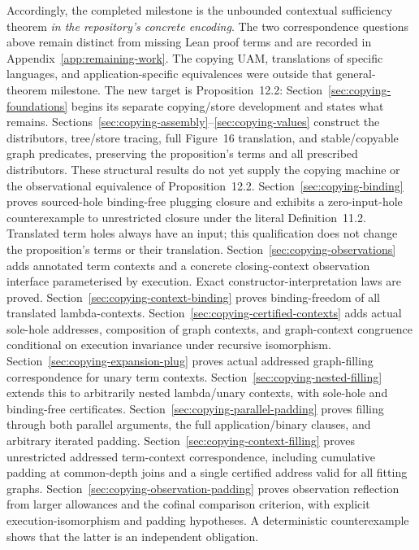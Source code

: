 Accordingly, the completed milestone is the unbounded contextual sufficiency
theorem \emph{in the repository's concrete encoding}. The two correspondence
questions above remain distinct from missing Lean proof terms and are recorded
in Appendix~\ref{app:remaining-work}. The copying UAM, translations of specific
languages, and application-specific equivalences were outside that general-theorem
milestone. The new target is Proposition~12.2: Section~\ref{sec:copying-foundations}
begins its separate copying/store development and states what remains.
Sections~\ref{sec:copying-assembly}--\ref{sec:copying-values} construct the
distributors, tree/store tracing, full Figure~16 translation, and stable/copyable
graph predicates, preserving the proposition's terms and all prescribed
distributors. These structural results do not yet supply the copying machine
or the observational equivalence of Proposition~12.2.
Section~\ref{sec:copying-binding} proves sourced-hole binding-free plugging
closure and exhibits a zero-input-hole counterexample to unrestricted closure
under the literal Definition~11.2. Translated term holes always have an input;
this qualification does not change the proposition's terms or their translation.
Section~\ref{sec:copying-observations} adds annotated term contexts and a
concrete closing-context observation interface parameterised by execution.
Exact constructor-interpretation laws are proved.
Section~\ref{sec:copying-context-binding} proves binding-freedom of all
translated lambda-contexts. Section~\ref{sec:copying-certified-contexts}
adds actual sole-hole addresses, composition of graph contexts, and
graph-context congruence conditional on execution invariance under recursive
isomorphism. Section~\ref{sec:copying-expansion-plug} proves actual
addressed graph-filling correspondence for unary term contexts.
Section~\ref{sec:copying-nested-filling} extends this to arbitrarily nested
lambda/unary contexts, with sole-hole and binding-free certificates.
Section~\ref{sec:copying-parallel-padding} proves filling through both parallel
arguments, the full application/binary clauses, and arbitrary iterated padding.
Section~\ref{sec:copying-context-filling} proves unrestricted addressed
term-context correspondence, including cumulative padding at common-depth
joins and a single certified address valid for all fitting graphs.
Section~\ref{sec:copying-observation-padding} proves observation reflection
from larger allowances and the cofinal comparison criterion, with explicit
execution-isomorphism and padding hypotheses. A deterministic counterexample
shows that the latter is an independent obligation.
